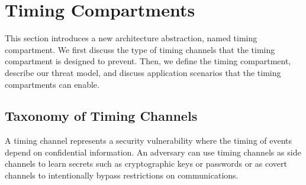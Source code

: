 \section{Timing Compartments}

This section introduces a new architecture abstraction, named timing compartment.
We first discuss the type of timing channels that the timing compartment is designed
to prevent. Then, we define the timing compartment, describe our threat model,
and discuss application scenarios that the timing compartments can enable.


\subsection{Taxonomy of Timing Channels}


A timing channel represents a security vulnerability where the timing of events
depend on confidential information. An adversary can use timing channels as
side channels to learn secrets such as cryptographic keys or passwords or as
covert channels to intentionally bypass restrictions on communications.


